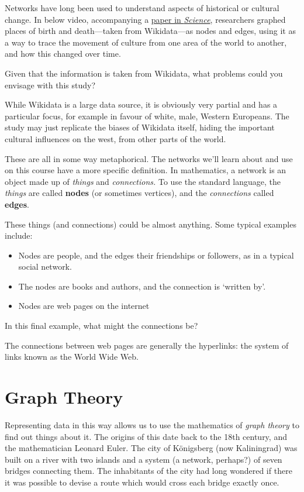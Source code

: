 \documentclass[
]{book}
\begin{document}
Networks have long been used to understand aspects of historical or cultural change. In below video, accompanying a \href{https://www.science.org/doi/10.1126/science.1240064}{paper in \emph{Science}}, researchers graphed places of birth and death---taken from Wikidata---as nodes and edges, using it as a way to trace the movement of culture from one area of the world to another, and how this changed over time.

Given that the information is taken from Wikidata, what problems could you envisage with this study?

While Wikidata is a large data source, it is obviously very partial and has a particular focus, for example in favour of white, male, Western Europeans. The study may just replicate the biases of Wikidata itself, hiding the important cultural influences on the west, from other parts of the world.

These are all in some way metaphorical. The networks we'll learn about and use on this course have a more specific definition. In mathematics, a network is an object made up of \emph{things} and \emph{connections.} To use the standard language, the \emph{things} are called \textbf{nodes} (or sometimes vertices), and the \emph{connections} called \textbf{edges}.

These things (and connections) could be almost anything. Some typical examples include:

\begin{itemize}
\item
  Nodes are people, and the edges their friendships or followers, as in a typical social network.
\item
  The nodes are books and authors, and the connection is `written by'.
\item
  Nodes are web pages on the internet
\end{itemize}

In this final example, what might the connections be?

The connections between web pages are generally the hyperlinks: the system of links known as the World Wide Web.

\hypertarget{graph-theory}{%
\section{Graph Theory}\label{graph-theory}}

Representing data in this way allows us to use the mathematics of \emph{graph theory} to find out things about it. The origins of this date back to the 18th century, and the mathematician Leonard Euler. The city of Königsberg (now Kaliningrad) was built on a river with two islands and a system (a network, perhaps?) of seven bridges connecting them. The inhabitants of the city had long wondered if there it was possible to devise a route which would cross each bridge exactly once.
\end{document}
